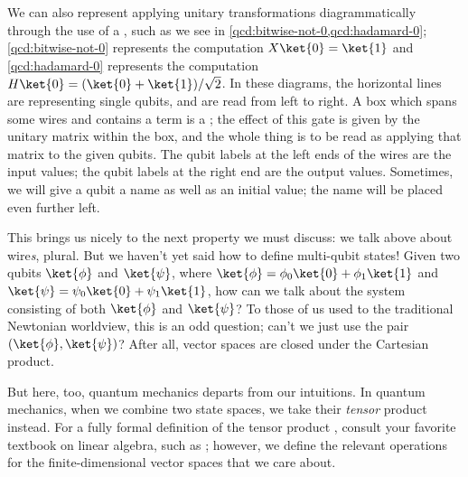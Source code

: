 We can also represent applying unitary transformations diagrammatically through
the use of a , such as we see in
\cref{qcd:bitwise-not-0,qcd:hadamard-0}; \cref{qcd:bitwise-not-0} represents the
computation $X\ket{0} = \ket{1}$ and \cref{qcd:hadamard-0} represents the
computation $H\ket{0} = (\ket{0} + \ket{1})/\sqrt{2}$.  In these diagrams, the
horizontal lines are  representing single qubits, and are read from
left to right.  A box which spans some wires and contains a term is a
; the effect of this gate is given by the unitary matrix within the
box, and the whole thing is to be read as applying that matrix to the given
qubits.\footnotemark{} The qubit labels at the left ends of the wires are the
input values; the qubit labels at the right end are the output values.
Sometimes, we will give a qubit a name as well as an initial value; the name
will be placed even further left.


This brings us nicely to the next property we must discuss: we talk above about
wire\emph{s}, plural.  But we haven't yet said how to define multi-qubit states!
Given two qubits $\ket{\phi}$ and $\ket{\psi}$, where $\ket{\phi} =
\phi_0\ket{0} + \phi_1\ket{1}$ and $\ket{\psi} = \psi_0\ket{0} + \psi_1\ket{1}$,
how can we talk about the system consisting of both $\ket{\phi}$ and
$\ket{\psi}$?  To those of us used to the traditional Newtonian worldview, this
is an odd question; can't we just use the pair $(\ket{\phi},\ket{\psi})$?  After
all, vector spaces are closed under the Cartesian product.

But here, too, quantum mechanics departs from our intuitions.  In quantum
mechanics, when we combine two state spaces, we take their \emph{tensor} product
instead.  For a fully formal definition of the tensor product , consult your favorite textbook on linear algebra,
such as ; however, we define the relevant operations for the
finite-dimensional vector spaces that we care about.


